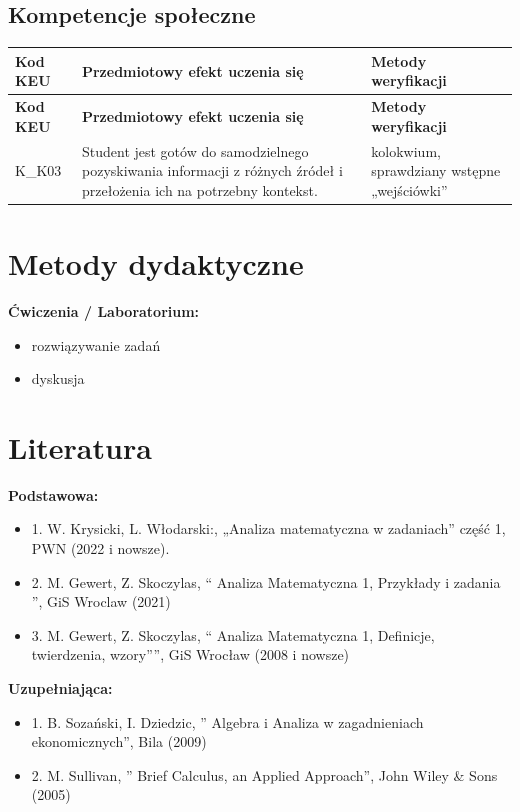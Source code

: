 \documentclass[12pt, a4paper]{article}
\newcommand{\thdrule}{\noalign{\global\setlength{\extrarowheight}{0pt}}}
\newcommand{\thdend}{\noalign{\global\setlength{\extrarowheight}{3pt}}}
\begin{document}
\subsection*{Kompetencje społeczne}
{\scriptsize
\begin{longtable}{m{1.6cm}m{9.0cm}m{4.2cm}}
\thdrule\toprule
\rowcolor{pjatkRed} {\color{white}\footnotesize\textbf{\vphantom{Ag}Kod KEU}} & {\color{white}\footnotesize\textbf{\vphantom{Ag}Przedmiotowy efekt uczenia się}} & {\color{white}\footnotesize\textbf{\vphantom{Ag}Metody weryfikacji}} \\
\midrule\thdend
\endfirsthead
\thdrule\toprule
\rowcolor{pjatkRed} {\color{white}\footnotesize\textbf{\vphantom{Ag}Kod KEU}} & {\color{white}\footnotesize\textbf{\vphantom{Ag}Przedmiotowy efekt uczenia się}} & {\color{white}\footnotesize\textbf{\vphantom{Ag}Metody weryfikacji}} \\
\midrule\thdend
\endhead
  \rowcolor{tableRowLight} K\_K03 & Student jest gotów do samodzielnego pozyskiwania informacji z różnych źródeł i przełożenia ich na potrzebny kontekst. & kolokwium, sprawdziany wstępne „wejściówki'' \\
\bottomrule
\end{longtable}}

\section{Metody dydaktyczne}

\textbf{Ćwiczenia / Laboratorium:}
\begin{itemize}
  \item rozwiązywanie zadań
  \item dyskusja
\end{itemize}
\vspace{4pt}


\section{Literatura}

\textbf{Podstawowa:}
\begin{itemize}
  \item 1. W. Krysicki, L. Włodarski:, „Analiza matematyczna w zadaniach” część 1, PWN (2022 i nowsze).
  \item 2. M. Gewert, Z. Skoczylas, “ Analiza Matematyczna 1, Przykłady i zadania ”, GiS Wroclaw (2021)
  \item 3.  M. Gewert, Z. Skoczylas, “ Analiza Matematyczna 1, Definicje, twierdzenia, wzory''”, GiS Wrocław (2008 i nowsze)
\end{itemize}

\textbf{Uzupełniająca:}
\begin{itemize}
  \item 1. B. Sozański, I. Dziedzic, '' Algebra i Analiza w zagadnieniach ekonomicznych'', Bila (2009)
  \item 2.  M. Sullivan, '' Brief  Calculus, an Applied Approach'', John Wiley \& Sons (2005)
\end{itemize}
\end{document}
